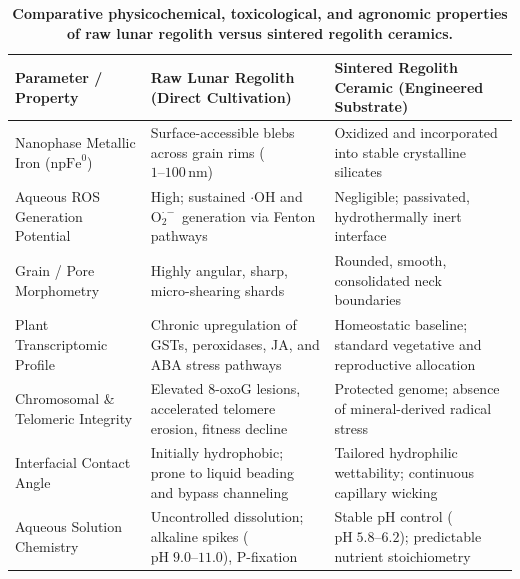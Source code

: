 \begin{table}[t!]
\small
\centering
\caption{\textbf{Comparative physicochemical, toxicological, and agronomic properties of raw lunar regolith versus sintered regolith ceramics.}}
\label{tab:toxicity_comparison}
\begin{tabularx}{\textwidth}{lXX}
\toprule
\textbf{Parameter / Property} & \textbf{Raw Lunar Regolith (Direct Cultivation)} & \textbf{Sintered Regolith Ceramic (Engineered Substrate)} \\
\midrule
Nanophase Metallic Iron ($\mathrm{npFe}^0$) & Surface-accessible blebs across grain rims ($1\text{--}100\,\mathrm{nm}$)\cite{paul2022plants,ming1989lunar,krejci2026lunar} & Oxidized and incorporated into stable crystalline silicates\cite{ming1989lunar,taylor2005microwave} \\
\addlinespace
Aqueous ROS Generation Potential & High; sustained $\cdot\mathrm{OH}$ and $\mathrm{O}_2^{\cdot-}$ generation via Fenton pathways\cite{paul2022plants,hendrix2024reactivity,turci2015mechanistic} & Negligible; passivated, hydrothermally inert interface\cite{ming1989lunar,turci2015mechanistic,sperl2017influence} \\
\addlinespace
Grain / Pore Morphometry & Highly angular, sharp, micro-shearing shards\cite{ming1989lunar,hendrix2024reactivity,fackrell2024mechanical} & Rounded, smooth, consolidated neck boundaries\cite{ming1989lunar,xi2026multiphysics,goulas2017process} \\
\addlinespace
Plant Transcriptomic Profile & Chronic upregulation of GSTs, peroxidases, JA, and ABA stress pathways\cite{paul2022plants,krejci2026lunar} & Homeostatic baseline; standard vegetative and reproductive allocation\cite{paul2022plants,ming1989lunar} \\
\addlinespace
Chromosomal \& Telomeric Integrity & Elevated 8-oxoG lesions, accelerated telomere erosion, fitness decline\cite{barbero2024telomere,shippen2019telomere,min2023protection} & Protected genome; absence of mineral-derived radical stress\cite{ming1989lunar,barbero2024telomere} \\
\addlinespace
Interfacial Contact Angle & Initially hydrophobic; prone to liquid beading and bypass channeling\cite{paul2022plants,steinberg2007fluid} & Tailored hydrophilic wettability; continuous capillary wicking\cite{ming1989lunar,heinse2007porous} \\
\addlinespace
Aqueous Solution Chemistry & Uncontrolled dissolution; alkaline spikes ($\mathrm{pH}\;9.0\text{--}11.0$), P-fixation\cite{ming1989lunar,hendrix2024reactivity,wamelink2024struvite} & Stable $\mathrm{pH}$ control ($\mathrm{pH}\;5.8\text{--}6.2$); predictable nutrient stoichiometry\cite{ming1989lunar} \\
\bottomrule
\end{tabularx}
\end{table}
